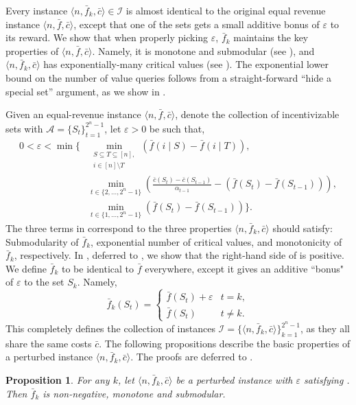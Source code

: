 \documentclass[11pt]{article}
\newtheorem{proposition}{Proposition}
\newcommand{\eps}{\varepsilon}
\newcommand{\I}{\mathcal{I}}
\newcommand{\IS}{\mathcal{A}}
\newcommand{\feq}{\bar{f}}
\newcommand{\ceq}{\bar{c}}
\newcommand{\eqRevInst}{\langle n,\feq,\ceq \rangle}
\newcommand{\perturbedInst}{\langle n,\feq_k,\ceq \rangle}
\newcommand{\familyI}{\I = \{ \perturbedInst \}_{k=1}^{2^n-1}}
\begin{document}
Every instance $\perturbedInst \in \I$ is almost identical to the original equal revenue instance $\eqRevInst$, except that one of the sets gets a small additive bonus of $\eps$ to its reward. 
We show that when properly picking $\eps$, $\feq_k$ maintains the key properties of $\eqRevInst$. Namely, it is monotone and submodular (see ), and $\perturbedInst$ has exponentially-many critical values (see ).
The exponential lower bound on the number of value queries follows from a straight-forward ``hide a special set'' argument, as we show in .


Given an equal-revenue instance $\eqRevInst$, denote the collection of incentivizable sets with $\IS = \{S_t\}_{t=1}^{2^n-1}$, let $\eps>0$ be such that,
\begin{align}\label{eq:eps_0}
0 < 
\eps < \min \Bigg\{ 
& \min_{\substack{S \subseteq T \subseteq [n], \\ i \in [n]\setminus T}} (\feq(i \mid S) - \feq(i \mid T)), \nonumber \\
& \min_{t \in \{2,\dots,2^n-1\}} \left(\frac{\ceq(S_t) - \ceq(S_{t-1})}{\alpha_{t-1}} - (\feq(S_t) - \feq(S_{t-1}))\right), \\
& \min_{t \in \{1,\dots,2^n-1\}} \left(\feq(S_{t})-\feq(S_{t-1})\right) \Bigg\}.
\nonumber
\end{align}
The three terms in  correspond to the three properties $\perturbedInst$ should satisfy: Submodularity of $\feq_k$, exponential number of critical values, and monotonicity of $\feq_k$, respectively.
In , deferred to , we show that the right-hand side of  is positive.
We define $\feq_k$ to be identical to $\feq$ everywhere, except it gives an additive ``bonus" of $\eps$ to the set $S_k$. Namely,
$$
\feq_k(S_t) = 
\begin{cases}
\feq(S_t) + \eps & t=k, \\
\feq(S_t) & t \ne k.
\end{cases}
$$
This completely defines the collection of instances $\familyI$, as they all share the same costs $\ceq$.
The following propositions describe the basic properties of a perturbed instance $\perturbedInst$. The proofs are deferred to .
\begin{proposition}\label{prop:feq_kSubmod}
    For any $k$, let $\langle n, \feq_k, \ceq \rangle$ be a perturbed instance with $\eps$ satisfying .
    Then $\feq_k$ is non-negative, monotone and submodular.
\end{proposition}
\end{document}
